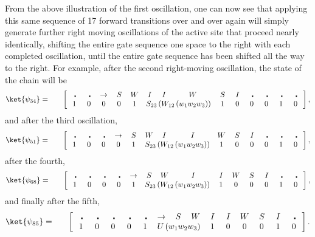 \documentclass[11pt,letterpaper]{article}
\newcommand{\<}{\langle}
\renewcommand{\>}{\rangle}
\newcommand{\bul}{\:\:\centerdot\:}       %
\newcommand{\iga}{\:I\,}                  %
\newcommand{\wga}{W}						%
\newcommand{\sga}{\:S\,}					%
\begin{document}
From the above illustration of the first oscillation, one can now see that applying this same sequence of 17 forward transitions over and over again will simply generate further right moving oscillations of the active site that proceed nearly identically, shifting the entire gate sequence one space to the right with each completed oscillation, until the entire gate sequence has been shifted all the way to the right. For example, after the second right-moving oscillation, the state of the chain will be 
\begin{eqnarray}
	\ket{\psi_{34}} &=& \quad \left[ \begin{array}{cccccccccccccc}
		\bul & \bul & \rightarrow & \sga & \wga & \iga & \iga & 
		\wga & \sga & \iga & 
		\bul & \bul & \bul & \bul
		\\		
		1    & 0    & 0    & 0    & 1    & 
		\multicolumn{3}{c}{S_{23}\left(W_{12}\left(w_1w_2w_3\right)\right)}
		 &
		1    & 0    & 0    & 0    & 1	& 0	
 	\end{array} \right], \label{psi34}
\end{eqnarray}
and after the third oscillation,
\begin{eqnarray}
	\ket{\psi_{51}} &=& \quad \left[ \begin{array}{cccccccccccccc}
		\bul & \bul & \bul & \rightarrow & \sga & \wga & \iga & \iga & 
		\wga & \sga & \iga & 
		\bul & \bul & \bul 
		\\		
		1    & 0    & 0    & 0    & 1    & 
		\multicolumn{3}{c}{S_{23}\left(W_{12}\left(w_1w_2w_3\right)\right)}
		 &
		1    & 0    & 0    & 0    & 1	& 0	
 	\end{array} \right], \label{psi51}
\end{eqnarray}
after the fourth,
\begin{eqnarray}
	\ket{\psi_{68}} &=& \quad \left[ \begin{array}{cccccccccccccc}
		\bul & \bul & \bul & \bul & \rightarrow & \sga & \wga & \iga & \iga & 
		\wga & \sga & \iga & 
		\bul & \bul
		\\		
		1    & 0    & 0    & 0    & 1    & 
		\multicolumn{3}{c}{S_{23}\left(W_{12}\left(w_1w_2w_3\right)\right)}
		 &
		1    & 0    & 0    & 0    & 1	& 0	
 	\end{array} \right], \label{psi51}
\end{eqnarray}
and finally after the fifth,
\begin{eqnarray}
	\ket{\psi_{85}} &=& \quad \left[ \begin{array}{cccccccccccccc}
		\bul & \bul & \bul & \bul & \bul & \rightarrow & \sga & \wga & \iga & \iga & 
		\wga & \sga & \iga & 
		\bul
		\\		
		1    & 0    & 0    & 0    & 1    & 
		\multicolumn{3}{c}{U\left(w_1w_2w_3\right)}
		 &
		1    & 0    & 0    & 0    & 1	& 0	
 	\end{array} \right]. \label{psi51}
\end{eqnarray}
\end{document}
